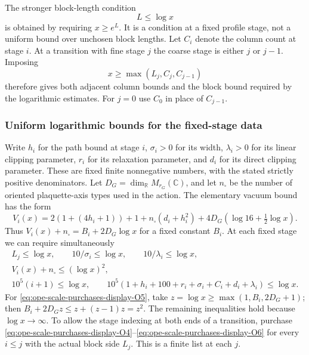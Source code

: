 The stronger block-length condition
\begin{equation}
                             L\le\log x
 \label{eq:ope-scale-purchases-display-O2}
\end{equation}
is obtained by requiring $x\ge e^L$. It is a condition at a fixed
profile stage, not a uniform bound over unchosen block lengths.
Let $C_i$ denote the column count at stage $i$. At a transition with
fine stage $j$ the coarse stage is either $j$ or $j-1$.
Imposing
\begin{equation}
                    x\ge\max(L_j,C_j,C_{j-1})
 \label{eq:ope-scale-purchases-display-O3}
\end{equation}
therefore gives both adjacent column bounds and the block bound
required by the logarithmic estimates. For $j=0$ use $C_0$ in
place of $C_{j-1}$.

\subsubsection{Uniform logarithmic bounds for the fixed-stage data}
Write $h_i$ for the path bound at stage $i$, $\sigma_i>0$ for its
width, $\lambda_i>0$ for its linear clipping parameter,
$r_i$ for its relaxation parameter, and $d_i$ for its direct
clipping parameter. These are fixed finite nonnegative numbers,
with the stated strictly positive denominators. Let
$D_G=\dim_{\mathbb R}M_{r_G}(\mathbb C)$, and let $n_\square$
be the number of oriented plaquette-axis types used in the action.
The elementary vacuum bound has the form
\[
 V_i(x)=2(1+(4h_i+1))+1+n_\square(d_i+h_i^2)
                  +4D_G(\log16+\tfrac12\log x).
\]
Thus $V_i(x)+n_\square=B_i+2D_G\log x$ for a fixed constant
$B_i$. At each fixed stage we can require simultaneously
\begin{gather}
 L_j\le\log x,\qquad 10/\sigma_i\le\log x,\qquad
 10/\lambda_i\le\log x,\label{eq:ope-scale-purchases-display-O4}\\
 V_i(x)+n_\square\le(\log x)^2,\label{eq:ope-scale-purchases-display-O5}\\
 10^5(i+1)\le\log x,\qquad
 10^5(1+h_i+100+r_i+\sigma_i+C_i+d_i+\lambda_i)
                       \le\log x.\label{eq:ope-scale-purchases-display-O6}
\end{gather}
For \eqref{eq:ope-scale-purchases-display-O5}, take $z=\log x\ge\max(1,B_i,2D_G+1)$; then
$B_i+2D_Gz\le z+(z-1)z=z^2$. The remaining inequalities
hold because $\log x\to\infty$. To allow the stage indexing at
both ends of a transition, purchase \eqref{eq:ope-scale-purchases-display-O4}--\eqref{eq:ope-scale-purchases-display-O6} for every $i\le j$
with the actual block side $L_j$. This is a finite list at each $j$.


